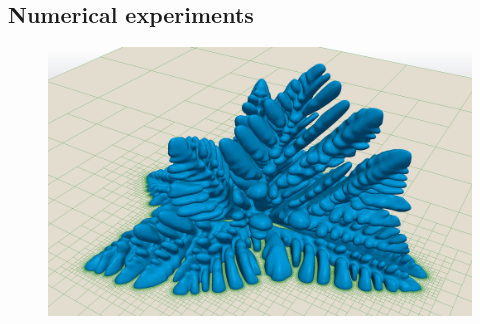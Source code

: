 \subsection{Numerical experiments}

\begin{figure}[ht!]
\begin{center}
\includegraphics[width=.8\textwidth]{pictures/crystal_grid_low.png}
\end{center}
\end{figure}